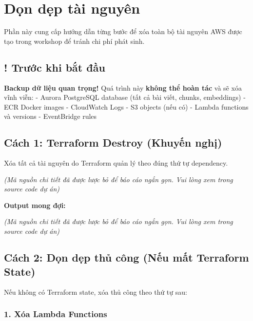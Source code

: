 \hypertarget{dux1ecdn-dux1eb9p-tuxe0i-nguyuxean}{%
\section{Dọn dẹp tài nguyên}}

Phần này cung cấp hướng dẫn từng bước để xóa toàn bộ tài nguyên AWS được
tạo trong workshop để tránh chi phí phát sinh.

\hypertarget{trux1b0ux1edbc-khi-bux1eaft-ux111ux1ea7u}{%
\subsection{! Trước khi bắt
đầu}}

\textbf{Backup dữ liệu quan trọng!} Quá trình này \textbf{không thể hoàn
tác} và sẽ xóa vĩnh viễn: - Aurora PostgreSQL database (tất cả bài viết,
chunks, embeddings) - ECR Docker images - CloudWatch Logs - S3 objects
(nếu có) - Lambda functions và versions - EventBridge rules

\hypertarget{cuxe1ch-1-terraform-destroy-khuyux1ebfn-nghux1ecb}{%
\subsection{Cách 1: Terraform Destroy (Khuyến
nghị)}}

Xóa tất cả tài nguyên do Terraform quản lý theo đúng thứ tự dependency.

\emph{(Mã nguồn chi tiết đã được lược bỏ để báo cáo ngắn gọn. Vui lòng
xem trong source code dự án)}

\textbf{Output mong đợi:}

\emph{(Mã nguồn chi tiết đã được lược bỏ để báo cáo ngắn gọn. Vui lòng
xem trong source code dự án)}

\hypertarget{cuxe1ch-2-dux1ecdn-dux1eb9p-thux1ee7-cuxf4ng-nux1ebfu-mux1ea5t-terraform-state}{%
\subsection{Cách 2: Dọn dẹp thủ công (Nếu mất Terraform
State)}}

Nếu không có Terraform state, xóa thủ công theo thứ tự sau:

\hypertarget{xuxf3a-lambda-functions}{%
\subsubsection{1. Xóa Lambda Functions}}

\begin{Shaded}
\begin{Highlighting}[]
\end{Highlighting}
\end{Shaded}

